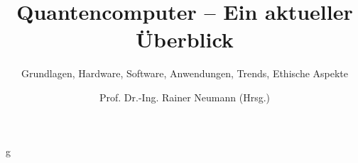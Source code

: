 \documentclass[graybox,envcountchap,sectrefs,deutsch]{svmono}
\begin{document}
\author{Prof. Dr.-Ing. Rainer Neumann (Hrsg.)}
\title{Quantencomputer -- Ein aktueller Überblick}
\subtitle{Grundlagen, Hardware, Software, Anwendungen, Trends, Ethische Aspekte}
\maketitle

\frontmatter%



\tableofcontents



\mainmatter%

g





















\backmatter%

\end{document}
